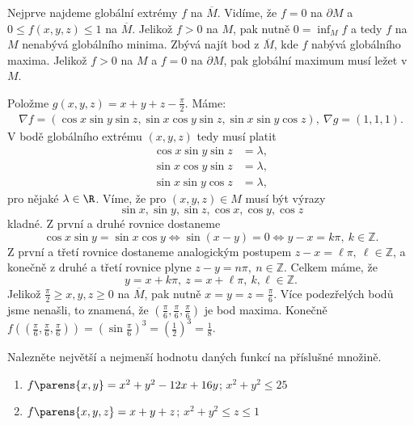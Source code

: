 \documentclass[answers]{exam}
\begin{document}
\begin{questions}
\begin{solution}
\begin{enumerate}[label=(\roman*)]
				Nejprve najdeme glob\'aln\'i extr\'emy $f$ na $\overline M$. Vid\'ime, \v ze $f=0$ na $\partial M$ a $0\le f(x,y,z)\le 1$ na $\overline M$. Jeliko\v z $f>0$ na $M$, pak nutn\v e $0=\inf_{M} f$ a tedy $f$ na $M$ nenab\'yv\'a glob\'aln\'iho minima. Zb\'yv\'a naj\'it bod z $\overline M$, kde $f$ nab\'yv\'a  glob\'aln\'iho maxima. Jeliko\v z $f>0$ na $M$ a $f=0$ na $\partial M$, pak glob\'aln\'i maximum mus\'i le\v zet v $M$.
				
				Polo\v zme $g(x,y,z)=x+y+z-\frac{\pi}{2}$. M\'ame:
				\begin{align*}
				\nabla f=(\cos x\sin y\sin z,\sin x\cos y\sin z,\sin x\sin y\cos z),\ \nabla g=(1,1,1). 
				\end{align*}
				V bod\v e glob\'aln\'iho extr\'emu $(x,y,z)$ tedy mus\'i platit
				\begin{align*}
				 \cos x\sin y\sin z&=\lambda,\\
				 \sin x\cos y\sin z&=\lambda,\\
				 \sin x\sin y\cos z&=\lambda,
				\end{align*}
				pro n\v ejak\'e $\lambda\in\R$. V\'ime, \v ze pro $(x,y,z)\in M$ mus\'i b\'yt v\'yrazy
				$$\sin x,\sin y,\sin z,\cos x,\cos y,\cos z$$
				kladn\'e. Z prvn\'i a druh\'e rovnice dostaneme 
				$$\cos x\sin y=\sin x\cos y\Leftrightarrow\sin(x-y)=0\Leftrightarrow y-x=k\pi,\ k\in\mathbb Z. $$
				Z prvn\'i a t\v ret\'i rovnice dostaneme analogick\'ym postupem $z-x=\ell\pi,\ \ell\in\mathbb Z$, a kone\v cn\v e z druh\'e a t\v ret\'i rovnice plyne $z-y=n\pi,\ n\in\mathbb Z$. Celkem m\'ame, \v ze
				$$y=x+k\pi,\ z=x+\ell\pi,\ k,\ell\in\mathbb Z.$$
				Jeliko\v z $\frac{\pi}{2}\ge x,y,z\ge0$ na $\overline M$, pak nutn\v e $x=y=z=\frac{\pi}{6}$. V\'ice podez\v rel\'ych bod\r u jsme nena\v sli, to znamen\'a, \v ze $(\frac{\pi}{6},\frac{\pi}{6},\frac{\pi}{6})$ je bod maxima. Kone\v cn\v e
				$f((\frac{\pi}{6},\frac{\pi}{6},\frac{\pi}{6}))=(\sin\frac{\pi}{6})^3=(\frac{1}{2})^3 = \frac{1}{8}.$
		\end{enumerate}
	\end{solution}
	
  \question
  Nalezněte největší a nejmenší hodnotu daných funkcí na příslušné množině.
	\begin{enumerate}[label=(\roman*)]
		\item $f\parens{x, y} = x^2 + y^2 - 12x + 16y$; \quad $x^2 + y^2 \le 25$
		\item $f\parens{x, y, z} = x + y + z$; \quad $x^2 + y^2 \le z \le 1$
	\end{enumerate}
	

\end{questions}
\end{document}
